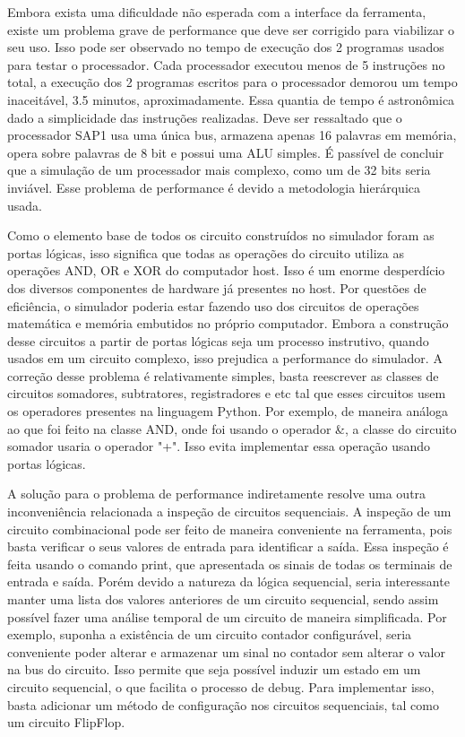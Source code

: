 Embora exista uma dificuldade não esperada com a interface da ferramenta, existe um problema grave de performance que deve ser corrigido para viabilizar o seu uso.
Isso pode ser observado no tempo de execução dos 2 programas usados para testar o processador.
Cada processador executou menos de 5 instruções no total, a execução dos 2 programas escritos para o processador demorou um tempo inaceitável, 3.5 minutos, aproximadamente.
Essa quantia de tempo é astronômica dado a simplicidade das instruções realizadas.
Deve ser ressaltado que o processador SAP1 usa uma única bus, armazena apenas 16 palavras em memória, opera sobre palavras de 8 bit e possui uma ALU simples.
É passível de concluir que a simulação de um processador mais complexo, como um de 32 bits seria inviável.
Esse problema de performance é devido a metodologia hierárquica usada.

Como o elemento base de todos os circuito construídos no simulador foram as portas lógicas, isso significa que todas as operações do circuito utiliza as operações AND, OR e XOR do computador host.
Isso é um enorme desperdício dos diversos componentes de hardware já presentes no host.
Por questões de eficiência, o simulador poderia estar fazendo uso dos circuitos de operações matemática e memória embutidos no próprio computador.
Embora a construção desse circuitos a partir de portas lógicas seja um processo instrutivo, quando usados em um circuito complexo, isso prejudica a performance do simulador.
A correção desse problema é relativamente simples, basta reescrever as classes de circuitos somadores, subtratores, registradores e etc tal que esses circuitos usem os operadores presentes na linguagem Python.
Por exemplo, de maneira análoga ao que foi feito na classe AND, onde foi usando o operador \&, a classe do circuito somador usaria o operador "+".
Isso evita implementar essa operação usando portas lógicas.

A solução para o problema de performance indiretamente resolve uma outra inconveniência relacionada a inspeção de circuitos sequenciais.
A inspeção de um circuito combinacional pode ser feito de maneira conveniente na ferramenta, pois basta verificar o seus valores de entrada para identificar a saída.
Essa inspeção é feita usando o comando print, que apresentada os sinais de todas os terminais de entrada e saída.
Porém devido a natureza da lógica sequencial, seria interessante manter uma lista dos valores anteriores de um circuito sequencial, sendo assim possível fazer uma análise temporal de um circuito de maneira simplificada.
Por exemplo, suponha a existência de um circuito contador configurável, seria conveniente poder alterar e armazenar um sinal no contador sem alterar o valor na bus do circuito.
Isso permite que seja possível induzir um estado em um circuito sequencial, o que facilita o processo de debug.
Para implementar isso, basta adicionar um método de configuração nos circuitos sequenciais, tal como um circuito FlipFlop. 

